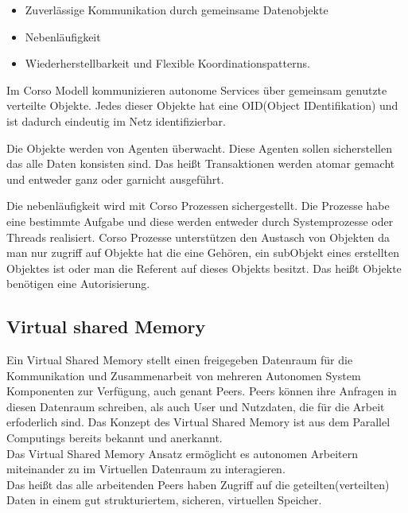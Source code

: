 \documentclass[a4paper,12pt]{scrreprt}
\begin{document}
			\begin{itemize}
			\item Zuverlässige Kommunikation durch gemeinsame Datenobjekte
			\item Nebenläufigkeit
			\item Wiederherstellbarkeit und Flexible Koordinationspatterns.
			\end{itemize}
			
			Im Corso Modell kommunizieren autonome Services über gemeinsam genutzte verteilte Objekte. Jedes dieser Objekte hat eine OID(Object IDentifikation) und ist dadurch eindeutig im Netz identifizierbar.
			
			Die Objekte werden von Agenten überwacht. Diese Agenten sollen sicherstellen das alle Daten konsisten sind. Das heißt Transaktionen werden atomar gemacht und entweder ganz oder garnicht ausgeführt.
			
			Die nebenläufigkeit wird mit Corso Prozessen sichergestellt. Die Prozesse habe eine bestimmte Aufgabe und diese werden entweder durch Systemprozesse oder Threads realisiert.
			Corso Prozesse unterstützen den Austasch von Objekten da man nur zugriff auf Objekte hat die eine Gehören, ein subObjekt eines erstellten Objektes ist oder man die Referent auf dieses Objekts besitzt.
			Das heißt Objekte benötigen eine Autorisierung.
			
			
			
						
			\subsection{Virtual shared Memory}
			
			Ein Virtual Shared Memory stellt einen freigegeben Datenraum für die Kommunikation und Zusammenarbeit von mehreren Autonomen System Komponenten zur Verfügung, auch genant Peers. Peers können ihre Anfragen in diesen Datenraum schreiben, als auch User und Nutzdaten, die für die Arbeit erfoderlich sind.
			Das Konzept des Virtual Shared Memory ist aus dem Parallel Computings bereits bekannt und anerkannt.\\
			Das Virtual Shared Memory Ansatz ermöglicht es autonomen Arbeitern miteinander zu im Virtuellen Datenraum zu interagieren.\\
			Das heißt das alle arbeitenden Peers haben Zugriff auf die geteilten(verteilten) Daten in einem gut strukturiertem, sicheren, virtuellen Speicher.
			 
			
			
			  
		
\end{document}
